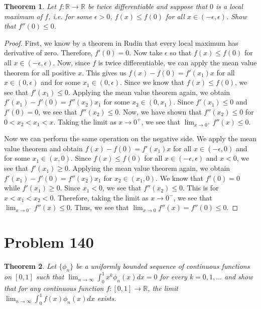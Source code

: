 \documentclass[psamsfonts]{amsart}
\newtheorem{thm}{Theorem}[section]
\theoremstyle{definition}
\theoremstyle{remark}
\numberwithin{equation}{section}
\begin{document}
\begin{thm}
Let $f: \mathbb{R} \to \mathbb{R}$ be twice differentiable and suppose that $0$ is a local maximum of $f$, i.e. for some $\epsilon > 0$, $f(x) \leq f(0)$ for all $x \in (- \epsilon, \epsilon)$. Show that $f''(0) \leq 0$. 
\end{thm}

\begin{proof}
First, we know by a theorem in Rudin that every local maximum has derivative of zero. Therefore, $f'(0) = 0$. Now take $\epsilon$ so that $f(x) \leq f(0)$ for all $x \in (-\epsilon, \epsilon)$. Now, since $f$ is twice differentiable, we can apply the mean value theorem for all positive $x$. This gives us $f(x) - f(0) = f'(x_1) x$ for all $x \in (0, \epsilon)$ and for some $x_1 \in (0,\epsilon)$. Since we know that $f(x) \leq f(0)$, we see that $f'(x_1) \leq 0$. Applying the mean value theorem again, we obtain $f'(x_1) - f'(0) = f''(x_2) x_1$ for some $x_2 \in (0,x_1)$. Since $f'(x_1) \leq 0$ and $f'(0) = 0$, we see that $f''(x_2) \leq 0$. Now, we have shown that $f''(x_2) \leq 0$ for $0 < x_2 < x_1 < x$. Taking the limit as $x \to 0^{+}$, we see that $\lim_{x \to 0^{+}} f''(x) \leq 0$. 

Now we can perform the same operation on the negative side. We apply the mean value theorem and obtain $f(x) - f(0) = f'(x_1) x$ for all $x \in (-\epsilon, 0)$ and for some $x_1 \in (x,0)$. Since $f(x) \leq f(0)$ for all $x \in (-\epsilon, \epsilon)$ and $x < 0$, we see that $f'(x_1) \geq 0$. Applying the mean value theorem again, we obtain $f'(x_1) - f'(0) = f''(x_2) x_1$ for $x_2 \in (x_1, 0)$. We know that $f'(0) = 0$ while $f'(x_1) \geq 0$. Since $x_1 <0$, we see that $f''(x_2) \leq 0$. This is for $x < x_1 < x_2 < 0$. Therefore, taking the limit as $x \to 0^{-}$, we see that $\lim_{x \to 0^{-}} f''(x) \leq 0$. Thus, we see that $\lim_{x \to 0} f''(x) = f''(0) \leq  0$.
\end{proof}

\section{Problem 140}

\begin{thm}
Let $\{ \phi_n \}$ be a uniformly bounded sequence of continuous functions on $[0,1]$ such that $\lim_{n \to \infty} \int_0^1 x^k \phi_n (x) dx = 0$ for every $k = 0, 1, \ldots$ and show that for any continuous function $f : [0,1] \to \mathbb{R}$, the limit $\lim_{n \to \infty} \int_0^1 f(x) \phi_n (x) dx$ exists.
\end{thm}
\end{document}
